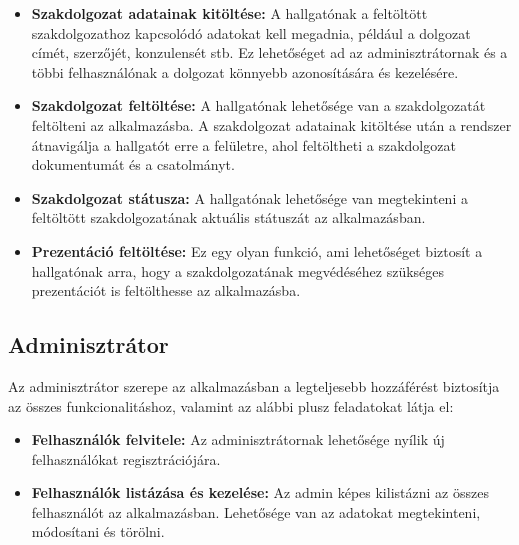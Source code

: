 \begin{itemize}

\item \textbf{Szakdolgozat adatainak kitöltése:} A hallgatónak a feltöltött szakdolgozathoz kapcsolódó adatokat kell megadnia, például a dolgozat címét, szerzőjét, konzulensét stb. Ez lehetőséget ad az adminisztrátornak és a többi felhasználónak a dolgozat könnyebb azonosítására és kezelésére.

\item \textbf{Szakdolgozat feltöltése:} A hallgatónak lehetősége van a szakdolgozatát feltölteni az alkalmazásba. A szakdolgozat adatainak kitöltése után a rendszer átnavigálja a hallgatót erre a felületre, ahol feltöltheti a szakdolgozat dokumentumát és a csatolmányt.

\item \textbf{Szakdolgozat státusza:} A hallgatónak lehetősége van megtekinteni a feltöltött szakdolgozatának aktuális státuszát az alkalmazásban. 

\item \textbf{Prezentáció feltöltése:} Ez egy olyan funkció, ami lehetőséget biztosít a hallgatónak arra, hogy a szakdolgozatának megvédéséhez szükséges prezentációt is feltölthesse az alkalmazásba.


\end{itemize}


\subsection{Adminisztrátor}

Az adminisztrátor szerepe az alkalmazásban a legteljesebb hozzáférést biztosítja az összes funkcionalitáshoz, valamint az alábbi plusz feladatokat látja el:

\begin{itemize}

\item \textbf{Felhasználók felvitele:} Az adminisztrátornak lehetősége nyílik új felhasználókat regisztrációjára.

\item \textbf{Felhasználók listázása és kezelése:} Az admin képes kilistázni az összes felhasználót az alkalmazásban. Lehetősége van az adatokat megtekinteni, módosítani és törölni.

\end{itemize}
